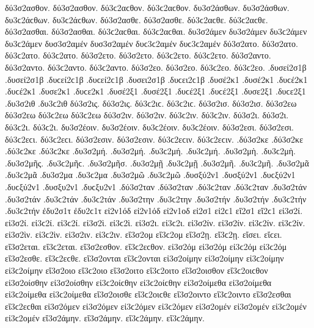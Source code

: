 {δύ3σ2ασθον. δύ3σ2ασθον. δύ3ϲ2αϲθον. δύ3ϲ2αϲθον. 
δυ3σ2άσθων. δυ3σ2άσθων. δυ3ϲ2άϲθων. δυ3ϲ2άϲθων. 
δύ3σ2ασθε. δύ3σ2ασθε. δύ3ϲ2αϲθε. δύ3ϲ2αϲθε. 
δύ3σ2ασθαι. δύ3σ2ασθαι. δύ3ϲ2αϲθαι. δύ3ϲ2αϲθαι. 
δυ3σ2άμεν δυ3σ2άμεν δυ3ϲ2άμεν δυ3ϲ2άμεν   %
δυσ3σ2αμέν δυσ3σ2αμέν δυϲ3ϲ2αμέν δυϲ3ϲ2αμέν 
δύ3σ2ατο. δύ3σ2ατο. δύ3ϲ2ατο. δύ3ϲ2ατο.   %
δύ3σ2ετο. δύ3σ2ετο. δύ3ϲ2ετο. δύ3ϲ2ετο.   %
δύ3σ2αντο. δύ3σ2αντο. δύ3ϲ2αντο. δύ3ϲ2αντο.   %
δύ3σ2εο. δύ3σ2εο. δύ3ϲ2εο. δύ3ϲ2εο.   %
.δυσεί2σ1β .δυσεί2σ1β .δυϲεί2ϲ1β .δυϲεί2ϲ1β   %
.δυσει2σ1β .δυϲει2ϲ1β 
.δυσέ2κ1 .δυσέ2κ1 .δυϲέ2κ1 .δυϲέ2κ1   %
.δυσε2κ1 .δυϲε2κ1 
.δυσέ2ξ1 .δυσέ2ξ1 .δυϲέ2ξ1 .δυϲέ2ξ1   %
.δυσε2ξ1 .δυϲε2ξ1 
.δυ3σ2ιθ .δυ3ϲ2ιθ   %
δύ3σ2ις. δύ3σ2ις. δύ3ϲ2ιϲ. δύ3ϲ2ιϲ.   %
δύ3σ2ισ. δύ3σ2ισ. 
δύ3σ2εω δύ3σ2εω δύ3ϲ2εω δύ3ϲ2εω 
δύ3σ2ιν. δύ3σ2ιν. δύ3ϲ2ιν. δύ3ϲ2ιν. 
δύ3σ2ι. δύ3σ2ι. δύ3ϲ2ι. δύ3ϲ2ι. 
δυ3σ2έοιν. δυ3σ2έοιν. δυ3ϲ2έοιν. δυ3ϲ2έοιν. 
δύ3σ2εσι. δύ3σ2εσι. δύ3ϲ2εϲι. δύ3ϲ2εϲι. 
δύ3σ2εσιν. δύ3σ2εσιν. δύ3ϲ2εϲιν. δύ3ϲ2εϲιν. 
.δύ3σ2κε .δύ3σ2κε .δύ3ϲ2κε .δύ3ϲ2κε   %
.δυ3σ2μή. .δυ3σ2μή. .δυ3ϲ2μή. .δυ3ϲ2μή.   %
.δυ3σ2μὴ. .δυ3ϲ2μὴ. 
.δυ3σ2μῆς. .δυ3ϲ2μῆϲ. 
.δυ3σ2μῆσ. 
.δυ3σ2μῇ .δυ3ϲ2μῇ 
.δυ3σ2μῆ. .δυ3ϲ2μῆ. 
.δυ3σ2μᾶ .δυ3ϲ2μᾶ 
.δυ3σ2μα .δυ3ϲ2μα 
.δυ3σ2μῶ .δυ3ϲ2μῶ 
.δυσξύ2ν1 .δυσξύ2ν1 .δυϲξύ2ν1 .δυϲξύ2ν1   %
.δυσξυ2ν1 .δυϲξυ2ν1 
.δύ3σ2ταν .δύ3σ2ταν .δύ3ϲ2ταν .δύ3ϲ2ταν   %
.δυ3σ2τάν .δυ3σ2τάν .δυ3ϲ2τάν .δυ3ϲ2τάν 
.δυ3σ2την .δυ3ϲ2την   %
.δυ3σ2τήν .δυ3σ2τήν .δυ3ϲ2τήν .δυ3ϲ2τήν 
ἐδυ2σ1τ ἐδυ2ϲ1τ   %
εἰ2ν1όδ εἰ2ν1όδ   %
εἰ2ν1οδ 
εἰ2σ1 εἰ2ϲ1   %
εἴ2σ1 εἴ2ϲ1 
εἰ3σ2ί. εἰ3σ2ί. εἰ3ϲ2ί. εἰ3ϲ2ί.   %
εἰ3σ2ὶ. εἰ3ϲ2ὶ. 
εἰ3σ2ι. εἰ3ϲ2ι. 
εἰ3σ2ίν. εἰ3σ2ίν. εἰ3ϲ2ίν. εἰ3ϲ2ίν. 
εἰ3σ2ὶν. εἰ3ϲ2ὶν. 
εἰ3σ2ιν. εἰ3ϲ2ιν. 
εἴ3σ2ομ εἴ3ϲ2ομ   %
εἴ3σ2ῃ. εἴ3ϲ2ῃ. εἴσει. εἴϲει. 
εἴ3σ2εται. εἴ3ϲ2εται. 
εἴ3σ2εσθον. εἴ3ϲ2εϲθον. 
εἰ3σ2όμ εἰ3σ2όμ εἰ3ϲ2όμ εἰ3ϲ2όμ   %
εἴ3σ2εσθε. εἴ3ϲ2εϲθε. 
εἴ3σ2ονται εἴ3ϲ2ονται 
%
εἰ3σ2οίμην εἰ3σ2οίμην εἰ3ϲ2οίμην εἰ3ϲ2οίμην 
εἴ3σ2οιο εἴ3ϲ2οιο 
εἴ3σ2οιτο εἴ3ϲ2οιτο 
εἴ3σ2οισθον εἴ3ϲ2οιϲθον 
εἰ3σ2οίσθην εἰ3σ2οίσθην εἰ3ϲ2οίϲθην εἰ3ϲ2οίϲθην 
εἰ3σ2οίμεθα εἰ3σ2οίμεθα εἰ3ϲ2οίμεθα εἰ3ϲ2οίμεθα 
εἴ3σ2οισθε εἴ3ϲ2οιϲθε 
εἴ3σ2οιντο εἴ3ϲ2οιντο 
%
εἴ3σ2εσθαι εἴ3ϲ2εϲθαι 
εἰ3σ2όμεν εἰ3σ2όμεν εἰ3ϲ2όμεν εἰ3ϲ2όμεν   %
εἰ3σ2ομέν εἰ3σ2ομέν εἰ3ϲ2ομέν εἰ3ϲ2ομέν 
%
εἴ3σ2άμην. εἴ3σ2άμην. εἴ3ϲ2άμην. εἴ3ϲ2άμην. 
}
